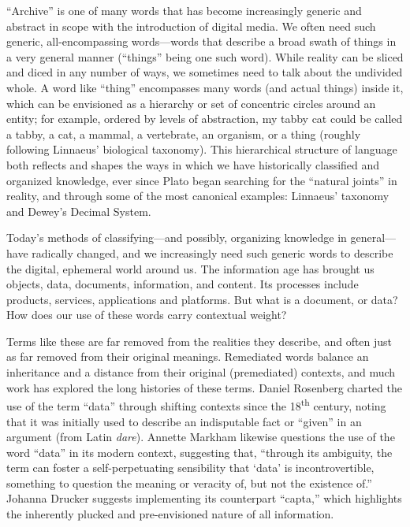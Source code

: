 ``Archive'' is one of many words that has become increasingly generic and abstract in scope with the introduction of digital media. We often need such generic, all-encompassing words---words that describe a broad swath of things in a very general manner (``things'' being one such word). While reality can be sliced and diced in any number of ways, we sometimes need to talk about the undivided whole. A word like ``thing'' encompasses many words (and actual things) inside it, which can be envisioned as a hierarchy or set of concentric circles around an entity; for example, ordered by levels of abstraction, my tabby cat could be called a tabby, a cat, a mammal, a vertebrate, an organism, or a thing (roughly following Linnaeus' biological taxonomy). This hierarchical structure of language both reflects and shapes the ways in which we have historically classified and organized knowledge, ever since Plato began searching for the ``natural joints'' in reality, and through some of the most canonical examples: Linnaeus' taxonomy and Dewey's Decimal System.

Today's methods of classifying---and possibly, organizing knowledge in general---have radically changed, and we increasingly need such generic words to describe the digital, ephemeral world around us. The information age has brought us objects, data, documents, information, and content. Its processes include products, services, applications and platforms. But what is a document, or data? How does our use of these words carry contextual weight?

Terms like these are far removed from the realities they describe, and often just as far removed from their original meanings. Remediated words balance an inheritance and a distance from their original (premediated) contexts, and much work has explored the long histories of these terms. Daniel Rosenberg charted the use of the term ``data'' through shifting contexts since the 18\textsuperscript{th} century, noting that it was initially used to describe an indisputable fact or ``given'' in an argument (from Latin \emph{dare}).\autocite[15-40]{rosenberg_data_2013}  Annette Markham likewise questions the use of the word ``data'' in its modern context, suggesting that, ``through its ambiguity, the term can foster a self-perpetuating sensibility that `data' is incontrovertible, something to question the meaning or veracity of, but not the existence of.''\autocite{markham_undermining_2013} Johanna Drucker suggests implementing its counterpart ``capta,'' which highlights the inherently plucked and pre-envisioned nature of all information.\autocite{drucker_humanities_2011}

